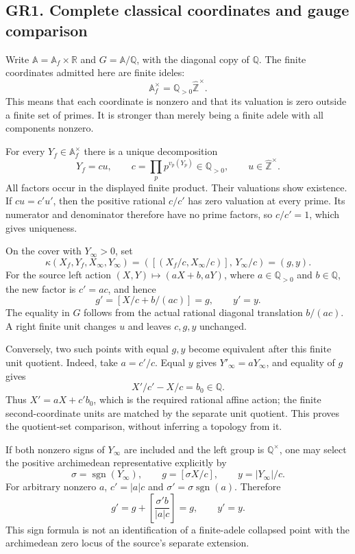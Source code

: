 \subsection{GR1. Complete classical coordinates and gauge
comparison}\label{gr1.-complete-classical-coordinates-and-gauge-comparison}

Write \(\mathbb A=\mathbb A_f\times\mathbb R\) and
\(G=\mathbb A/\mathbb Q\), with the diagonal copy of \(\mathbb Q\). The
finite coordinates admitted here are finite ideles: \[
\mathbb A_f^\times=\mathbb Q_{>0}\widehat{\mathbb Z}^{\times}.
\] This means that each coordinate is nonzero and that its valuation is
zero outside a finite set of primes. It is stronger than merely being a
finite adele with all components nonzero.

For every \(Y_f\in\mathbb A_f^\times\) there is a unique decomposition
\[
Y_f=c u,\qquad
c=\prod_p p^{v_p(Y_p)}\in\mathbb Q_{>0},\qquad
u\in\widehat{\mathbb Z}^{\times}.
\tag{GR1.1}
\] All factors occur in the displayed finite product. Their valuations
show existence. If \(c u=c'u'\), then the positive rational \(c/c'\) has
zero valuation at every prime. Its numerator and denominator therefore
have no prime factors, so \(c/c'=1\), which gives uniqueness.

On the cover with \(Y_\infty>0\), set \[
\kappa(X_f,Y_f,X_\infty,Y_\infty)
=\left([(X_f/c,X_\infty/c)],\,Y_\infty/c\right)
 = (g,y).
\tag{GR1.2}
\] For the source left action \((X,Y)\mapsto(aX+b,aY)\), where
\(a\in\mathbb Q_{>0}\) and \(b\in\mathbb Q\), the new factor is
\(c'=ac\), and hence \[
g'=[X/c+b/(ac)]=g,\qquad y'=y.
\tag{GR1.3}
\] The equality in \(G\) follows from the actual rational diagonal
translation \(b/(ac)\). A right finite unit changes \(u\) and leaves
\(c,g,y\) unchanged.

Conversely, two such points with equal \(g,y\) become equivalent after
this finite unit quotient. Indeed, take \(a=c'/c\). Equal \(y\) gives
\(Y'_\infty=aY_\infty\), and equality of \(g\) gives \[
X'/c'-X/c=b_0\in\mathbb Q.
\] Thus \(X'=aX+c'b_0\), which is the required rational affine action;
the finite second-coordinate units are matched by the separate unit
quotient. This proves the quotient-set comparison, without inferring a
topology from it.

If both nonzero signs of \(Y_\infty\) are included and the left group is
\(\mathbb Q^\times\), one may select the positive archimedean
representative explicitly by \[
\sigma=\operatorname{sgn}(Y_\infty),\qquad
g=[\sigma X/c],\qquad y=|Y_\infty|/c.
\] For arbitrary nonzero \(a\), \(c'=|a|c\) and
\(\sigma'=\sigma\operatorname{sgn}(a)\). Therefore \[
g'=g+\left[\frac{\sigma' b}{|a|c}\right]=g,\qquad y'=y.
\tag{GR1.4}
\] This sign formula is not an identification of a finite-adele
collapsed point with the archimedean zero locus of the source's separate
extension.

